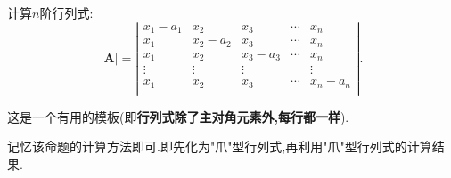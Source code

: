 \documentclass[../../main.tex]{subfiles}%
\begin{document}
\begin{corollary}\label{"爪"型行列式的推广}
计算$n$阶行列式:
\begin{equation}
|\boldsymbol{A}|=\left| \begin{matrix}
x_1-a_1&		x_2&		x_3&		\cdots&		x_n\\
x_1&		x_2-a_2&		x_3&		\cdots&		x_n\\
x_1&		x_2&		x_3-a_3&		\cdots&		x_n\\
\vdots&		\vdots&		\vdots&		&		\vdots\\
x_1&		x_2&		x_3&		\cdots&		x_n-a_n\\
\end{matrix} \right|.
\nonumber
\end{equation}
\end{corollary}
\begin{note}
这是一个有用的模板(即\textbf{行列式除了主对角元素外,每行都一样}).

记忆该命题的计算方法即可.即先化为"爪"型行列式,再利用"爪"型行列式的计算结果.
\end{note}
\end{document}
